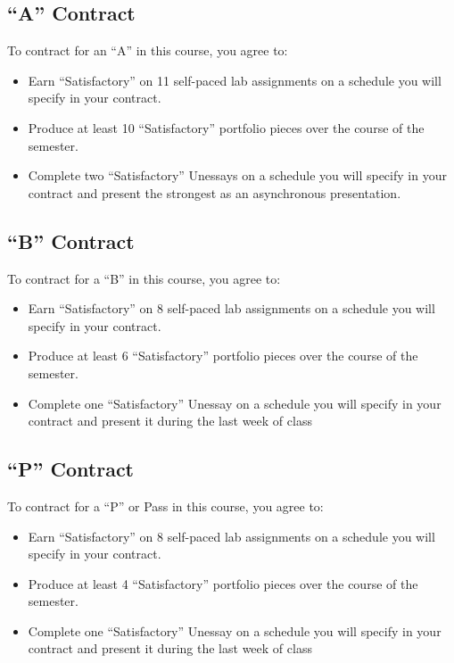 \hypertarget{a-contract}{%
\subsection*{``A'' Contract}\label{a-contract}}


To contract for an ``A'' in this course, you agree to:

\begin{itemize}
\item
  Earn ``Satisfactory'' on 11 self-paced lab assignments on a schedule you will specify in your contract.
\item
  Produce at least 10 ``Satisfactory'' portfolio pieces over the course of the semester.
\item
  Complete two ``Satisfactory'' Unessays on a schedule you will specify in your contract and present the strongest as an asynchronous presentation.
\end{itemize}

\hypertarget{b-contract}{%
\subsection*{``B'' Contract}\label{b-contract}}


To contract for a ``B'' in this course, you agree to:

\begin{itemize}
\item
  Earn ``Satisfactory'' on 8 self-paced lab assignments on a schedule you will specify in your contract.
\item
  Produce at least 6 ``Satisfactory'' portfolio pieces over the course of the semester.
\item
  Complete one ``Satisfactory'' Unessay on a schedule you will specify in your contract and present it during the last week of class
\end{itemize}

\hypertarget{p-contract}{%
\subsection*{``P'' Contract}\label{p-contract}}


To contract for a ``P'' or Pass in this course, you agree to:

\begin{itemize}
\item
  Earn ``Satisfactory'' on 8 self-paced lab assignments on a schedule you will specify in your contract.
\item
  Produce at least 4 ``Satisfactory'' portfolio pieces over the course of the semester.
\item
  Complete one ``Satisfactory'' Unessay on a schedule you will specify in your contract and present it during the last week of class
\end{itemize}

